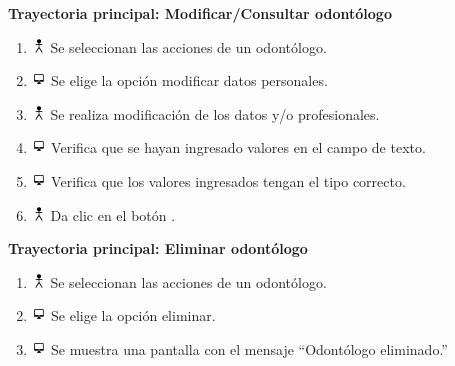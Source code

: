 \textbf{Trayectoria principal: Modificar/Consultar odontólogo}        
\begin{enumerate}
\item \includegraphics[height=1em]{pictures/actor.png} Se seleccionan las acciones de un odontólogo.
\item \includegraphics[height=1em]{pictures/sistema.png} Se elige la opción modificar datos personales.
\item \includegraphics[height=1em]{pictures/actor.png} Se realiza modificación de los datos y/o profesionales.
\item \includegraphics[height=1em]{pictures/sistema.png} Verifica que se hayan ingresado valores en el campo de texto.
\item \includegraphics[height=1em]{pictures/sistema.png} Verifica que los valores ingresados tengan el tipo correcto.
\item \includegraphics[height=1em]{pictures/actor.png} Da clic en el botón .
\end{enumerate} \bigskip

\textbf{Trayectoria principal: Eliminar odontólogo}        
\begin{enumerate}
\item \includegraphics[height=1em]{pictures/actor.png} Se seleccionan las acciones de un odontólogo.
\item \includegraphics[height=1em]{pictures/sistema.png} Se elige la opción eliminar.
\item \includegraphics[height=1em]{pictures/sistema.png} Se muestra una pantalla con el mensaje ``Odontólogo eliminado.''
\end{enumerate} \bigskip


